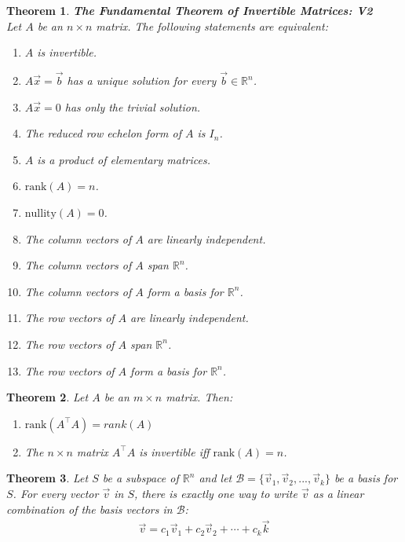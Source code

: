 \documentclass{article}
\theoremstyle{sltheorem}
\newtheorem{theorem}{Theorem}[section]
\begin{document}
\begin{theorem}
    \textbf{The Fundamental Theorem of Invertible Matrices: V2}\\
    Let $A$ be an $n\times n$ matrix. The following statements are equivalent:
    \begin{enumerate}
        \item $A$ is invertible.
        \item $A\vec x = \vec b$ has a unique solution for every $\vec b\in\mathbb{R}^n$.
        \item $A\vec x = 0$ has only the trivial solution.
        \item The reduced row echelon form of $A$ is $I_n$.
        \item $A$ is a product of elementary matrices.
        \item $\text{rank}(A)=n$.
        \item $\text{nullity}(A)=0$.
        \item The column vectors of $A$ are linearly independent.
        \item The column vectors of $A$ span $\mathbb{R}^n$.
        \item The column vectors of $A$ form a basis for $\mathbb{R}^n$.
        \item The row vectors of $A$ are linearly independent.
        \item The row vectors of $A$ span $\mathbb{R}^n$.
        \item The row vectors of $A$ form a basis for $\mathbb{R}^n$.
    \end{enumerate}
\end{theorem}
\begin{theorem}
    Let $A$ be an $m\times n$ matrix. Then:
    \begin{enumerate}
        \item $\text{rank}(A^\intercal A) = rank(A)$
        \item The $n\times n$ matrix $A^\intercal A$ is invertible iff $\text{rank}(A)=n$.
    \end{enumerate}
\end{theorem}
\begin{theorem}
    Let $S$ be a subspace of $\mathbb{R}^n$ and let $\mathcal{B}=\{\vec v_1, \vec v_2, ..., \vec v_k\}$ be a basis for $S$. For every vector $\vec v$ in $S$, there is exactly one way to write $\vec v$ as a linear combination of the basis vectors in $\mathcal{B}$:
    \begin{gather*}
        \vec v = c_1\vec v_1 + c_2\vec v_2 + \cdots + c_k\vec k
    \end{gather*}
\end{theorem}
\end{document}
